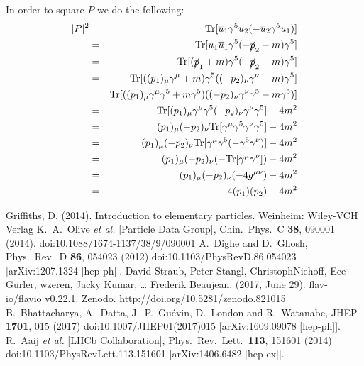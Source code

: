 \documentclass[12pt]{article}
\def \bea{\begin{eqnarray}}
\def \eea{\end{eqnarray}}
\def \Tr{{\rm Tr}}
\def \nn{\nonumber}
\def \nl{\nn \\}
\def \ou{\overline{u}}
\def \ga{\gamma}
\begin{document}
\begin{enumerate}
In order to square $P$ we do the following:
\bea
|P|^2&=& \Tr[\ou_1 \ga^5 u_2(-\ou_2 \ga^5 u_1)] \\
&=& \Tr[u_1 \ou_1 \ga^5(-\slashed{p}_2 - m) \ga^5] \nl
&=& \Tr[(\slashed{p}_1+m) \ga^5 (-\slashed{p}_2-m) \ga^5] \nl
&=& \Tr[((p_1)_\mu \ga^\mu+m) \ga^5 ((-p_2)_\nu\ga^\nu-m)  \ga^5] \nl
&=& \Tr[((p_1)_\mu \ga^\mu\ga^5+m\ga^5) ((-p_2)_\nu\ga^\nu\ga^5-m\ga^5)] \nl
&=& \Tr[(p_1)_\mu \ga^\mu\ga^5(-p_2)_\nu\ga^\nu\ga^5] - 4m^2 \nl
&=& (p_1)_\mu(-p_2)_\nu \Tr[\ga^\mu\ga^5\ga^\nu\ga^5]- 4m^2 \nl
&=& (p_1)_\mu(-p_2)_\nu \Tr[\ga^\mu\ga^5(-\ga^5\ga^\nu)]- 4m^2\nl
&=& (p_1)_\mu(-p_2)_\nu (-\Tr[\ga^\mu\ga^\nu])- 4m^2\nl
&=& (p_1)_\mu(-p_2)_\nu (-4g^{\mu\nu})- 4m^2\nl
&=& 4(p_1)(p_2)- 4m^2
\eea
\begin{thebibliography}{9}
Griffiths, D. (2014). Introduction to elementary particles. Weinheim: Wiley-VCH Verlag
  K.~A.~Olive {\it et al.} [Particle Data Group],
  Chin.\ Phys.\ C {\bf 38}, 090001 (2014).
  doi:10.1088/1674-1137/38/9/090001
  A.~Dighe and D.~Ghosh,
  Phys.\ Rev.\ D {\bf 86}, 054023 (2012)
  doi:10.1103/PhysRevD.86.054023
  [arXiv:1207.1324 [hep-ph]].
    David Straub, Peter Stangl, ChristophNiehoff, Ece Gurler, wzeren, Jacky Kumar, … Frederik Beaujean. (2017, June 29). flav-io/flavio v0.22.1. Zenodo. http://doi.org/10.5281/zenodo.821015
  B.~Bhattacharya, A.~Datta, J.~P.~Guévin, D.~London and R.~Watanabe,
  JHEP {\bf 1701}, 015 (2017)
  doi:10.1007/JHEP01(2017)015
  [arXiv:1609.09078 [hep-ph]].
  R.~Aaij {\it et al.} [LHCb Collaboration],
  Phys.\ Rev.\ Lett.\  {\bf 113}, 151601 (2014)
  doi:10.1103/PhysRevLett.113.151601
  [arXiv:1406.6482 [hep-ex]].

\end{thebibliography}
\end{enumerate}
\end{document}

